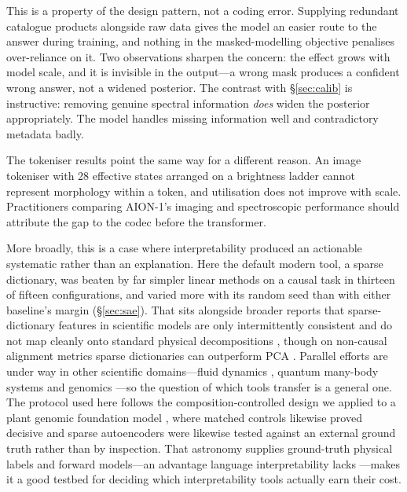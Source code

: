 \documentclass[11pt]{article}
\newcommand{\aion}{AION-1}
\begin{document}
This is a property of the design pattern, not a coding error. Supplying redundant catalogue
products alongside raw data gives the model an easier route to the answer during training, and
nothing in the masked-modelling objective penalises over-reliance on it. Two observations
sharpen the concern: the effect grows with model scale, and it is invisible in the output---a
wrong mask produces a confident wrong answer, not a widened posterior. The contrast with
\S\ref{sec:calib} is instructive: removing genuine spectral information \emph{does} widen the
posterior appropriately. The model handles missing information well and contradictory metadata
badly.

The tokeniser results point the same way for a different reason. An image tokeniser with 28
effective states arranged on a brightness ladder cannot represent morphology within a token, and
utilisation does not improve with scale. Practitioners comparing \aion{}'s imaging and
spectroscopic performance should attribute the gap to the codec before the transformer.

More broadly, this is a case where interpretability produced an actionable systematic rather
than an explanation. Here the default modern tool, a sparse dictionary, was
beaten by far simpler linear methods on a causal task in thirteen of fifteen configurations, and
varied more with its random seed than with either baseline's margin (\S\ref{sec:sae}). That sits
alongside broader reports that sparse-dictionary features in scientific models are only
intermittently consistent and do not map cleanly onto standard physical decompositions
\citep{rosenfeld2026sparse}, though on non-causal alignment metrics sparse dictionaries can
outperform PCA \citep{wu2025euclid}. Parallel efforts are
under way in other scientific domains---fluid dynamics \citep{hu2026cfd}, quantum many-body
systems \citep{qi2026quantum} and genomics \citep{guan2025genelm,kendiukhov2027plant}---so the
question of which tools transfer is a general one. The protocol used here follows the
composition-controlled design we applied to a plant genomic foundation model
\citep{kendiukhov2027plant}, where matched controls likewise proved decisive and sparse
autoencoders were likewise tested against an external ground truth rather than by inspection. That astronomy supplies
ground-truth physical labels and forward models---an advantage language interpretability lacks
\citep{cranmer2020symbolic,wetzel2025physics,lieu2025astronomy}---makes it a good testbed for
deciding which interpretability tools actually earn their cost.
\end{document}

